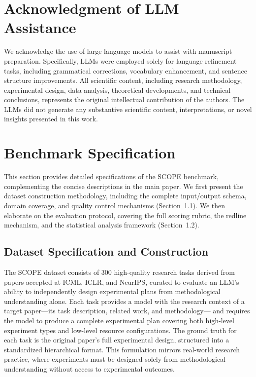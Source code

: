 \section*{Acknowledgment of LLM Assistance}

We acknowledge the use of large language models to assist with manuscript preparation. Specifically, LLMs were employed solely for language refinement tasks, including grammatical corrections, vocabulary enhancement, and sentence structure improvements. All scientific content, including research methodology, experimental design, data analysis, theoretical developments, and technical conclusions, represents the original intellectual contribution of the authors. The LLMs did not generate any substantive scientific content, interpretations, or novel insights presented in this work.

\section{Benchmark Specification}

This section provides detailed specifications of the \textsc{SCOPE} benchmark, complementing the concise descriptions in the main paper. We first present the dataset construction methodology, including the complete input/output schema, domain coverage, and quality control mechanisms (Section~1.1). We then elaborate on the evaluation protocol, covering the full scoring rubric, the redline mechanism, and the statistical analysis framework (Section~1.2).

\subsection{Dataset Specification and Construction}

The \textsc{SCOPE} dataset consists of 300 high-quality research tasks derived from papers accepted at ICML, ICLR, and NeurIPS, 
curated to evaluate an LLM's ability to independently design experimental plans from methodological understanding alone. 
Each task provides a model with the research context of a target paper---its task description, related work, and methodology---
and requires the model to produce a complete experimental plan covering both high-level experiment types and low-level 
resource configurations. The ground truth for each task is the original paper's full experimental design, structured into 
a standardized hierarchical format. This formulation mirrors real-world research practice, where experiments must be designed 
solely from methodological understanding without access to experimental outcomes.

